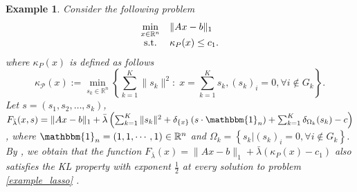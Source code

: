 \documentclass{article}
\numberwithin{equation}{section}
\newtheorem{example}{Example}[theorem]
\begin{document}
    \begin{example}
        Consider the following problem
        \begin{equation}\label{example_lasso}
            \begin{array}{cl}
            \min\limits_{x\in \mathbb{R}^n} & \|Ax-b\|_1\\
            {\rm s.t.} & \kappa_P(x)\le c_1.
            \end{array}
        \end{equation}
        where $\kappa_P(x)$ is defined as follows
        \begin{equation*} 
            \kappa_{\mathcal{P}}(x):=\min_{s_k\in \mathbb{R}^n}\left\{\sum_{k=1}^K\|s_k\|^2:\; x = \sum_{k=1}^{K} s_k, (s_k)_i=0, \forall i\notin G_k \right\}.
        \end{equation*}
        Let $s = (s_1, s_2,\dots, s_k)$, $F_{\bar{\lambda}}(x,s) =\|Ax-b\|_1+\bar{\lambda} \left(\sum_{k=1}^K \|s_k\|^2 + \delta_{\{x\}}\left(s\cdot\mathbbm{1}_n\right)
        + \sum_{k=1}^K\delta_{\Omega_k}(s_k)-c \right)$, where $\mathbbm{1}_n = (1,1,\cdots,1)\in \mathbb{R}^n$ and 
        $\Omega_k = \left\{ s_k| (s_k)_i = 0,\forall i\notin G_k \right\}$. By \cite[Theorem 3.1]{yu2022kurdyka},  we obtain that 
        the function $F_{\bar{\lambda}}(x) = \|Ax-b\|_1 + \bar{\lambda}(\kappa_P(x)-c_1)$ also satisfies the KL 
        property with exponent $\frac{1}{2}$ at every solution to problem \eqref{example_lasso} .
    \end{example}
\end{document}
